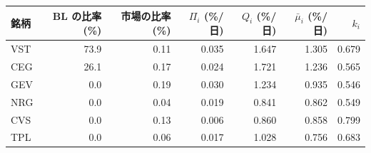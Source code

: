 \begin{tabular}{lrrrrrr}
\toprule
銘柄 & BL の比率 (\%) & 市場の比率 (\%) & $\Pi_i$ (\%/日) & $Q_i$ (\%/日) & $\bar\mu_i$ (\%/日) & $k_i$ \\
\midrule
VST & 73.9 & 0.11 & 0.035 & 1.647 & 1.305 & 0.679 \\
CEG & 26.1 & 0.17 & 0.024 & 1.721 & 1.236 & 0.565 \\
GEV & 0.0 & 0.19 & 0.030 & 1.234 & 0.935 & 0.546 \\
NRG & 0.0 & 0.04 & 0.019 & 0.841 & 0.862 & 0.549 \\
CVS & 0.0 & 0.13 & 0.006 & 0.860 & 0.858 & 0.799 \\
TPL & 0.0 & 0.06 & 0.017 & 1.028 & 0.756 & 0.683 \\
\bottomrule
\end{tabular}
